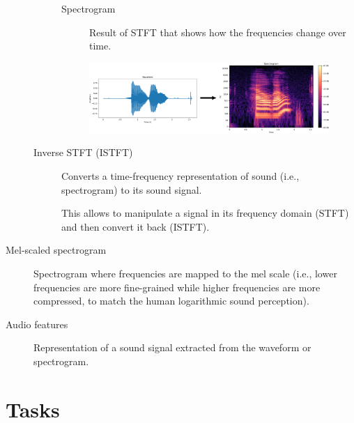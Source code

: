 \begin{description}
\begin{description}
                \begin{description}
                    \item[Spectrogram] 
                        Result of STFT that shows how the frequencies change over time.
                \end{description}

                \begin{figure}[H]
                    \centering
                    \includegraphics[width=0.8\linewidth]{./img/spectrogram.png}
                \end{figure}

            \item[Inverse STFT (ISTFT)] 
                Converts a time-frequency representation of sound (i.e., spectrogram) to its sound signal.

                \begin{remark}
                    This allows to manipulate a signal in its frequency domain (STFT) and then convert it back (ISTFT).
                \end{remark}
        \end{description}

    \item[Mel-scaled spectrogram] 
        Spectrogram where frequencies are mapped to the mel scale (i.e., lower frequencies are more fine-grained while higher frequencies are more compressed, to match the human logarithmic sound perception).

    \item[Audio features] 
        Representation of a sound signal extracted from the waveform or spectrogram.
\end{description}



\section{Tasks}

